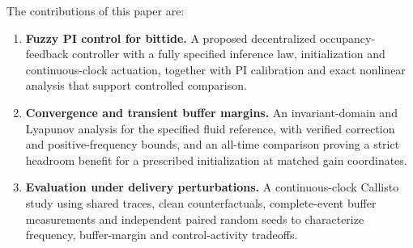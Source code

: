 The contributions of this paper are:

\begin{enumerate}
  \item \textbf{Fuzzy PI control for bittide.} A proposed decentralized occupancy-feedback controller with a fully specified inference law, initialization and continuous-clock actuation, together with PI calibration and exact nonlinear analysis that support controlled comparison.
  \item \textbf{Convergence and transient buffer margins.} An invariant-domain and Lyapunov analysis for the specified fluid reference, with verified correction and positive-frequency bounds, and an all-time comparison proving a strict headroom benefit for a prescribed initialization at matched gain coordinates.
  \item \textbf{Evaluation under delivery perturbations.} A continuous-clock Callisto study using shared traces, clean counterfactuals, complete-event buffer measurements and independent paired random seeds to characterize frequency, buffer-margin and control-activity tradeoffs.
\end{enumerate}
